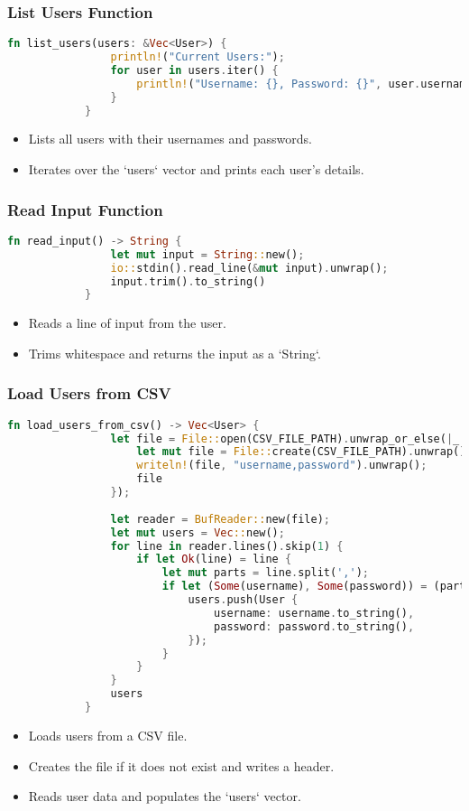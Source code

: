 \documentclass[aspectratio=169, table]{beamer}
\begin{document}
	\begin{frame}[fragile]
		\frametitle{List Users Function}
		\begin{lstlisting}[language=Rust]
			fn list_users(users: &Vec<User>) {
				println!("Current Users:");
				for user in users.iter() {
					println!("Username: {}, Password: {}", user.username, user.password);
				}
			}
		\end{lstlisting}
		\begin{itemize}
			\item Lists all users with their usernames and passwords.
			\item Iterates over the `users` vector and prints each user's details.
		\end{itemize}
	\end{frame}
	
	\begin{frame}[fragile]
		\frametitle{Read Input Function}
		\begin{lstlisting}[language=Rust]
			fn read_input() -> String {
				let mut input = String::new();
				io::stdin().read_line(&mut input).unwrap();
				input.trim().to_string()
			}
		\end{lstlisting}
		\begin{itemize}
			\item Reads a line of input from the user.
			\item Trims whitespace and returns the input as a `String`.
		\end{itemize}
	\end{frame}
	
	\begin{frame}[fragile]
		\frametitle{Load Users from CSV}
		\begin{lstlisting}[language=Rust]
			fn load_users_from_csv() -> Vec<User> {
				let file = File::open(CSV_FILE_PATH).unwrap_or_else(|_| {
					let mut file = File::create(CSV_FILE_PATH).unwrap();
					writeln!(file, "username,password").unwrap();
					file
				});
				
				let reader = BufReader::new(file);
				let mut users = Vec::new();
				for line in reader.lines().skip(1) {
					if let Ok(line) = line {
						let mut parts = line.split(',');
						if let (Some(username), Some(password)) = (parts.next(), parts.next()) {
							users.push(User {
								username: username.to_string(),
								password: password.to_string(),
							});
						}
					}
				}
				users
			}
		\end{lstlisting}
		\begin{itemize}
			\item Loads users from a CSV file.
			\item Creates the file if it does not exist and writes a header.
			\item Reads user data and populates the `users` vector.
		\end{itemize}
	\end{frame}
	
\end{document}
